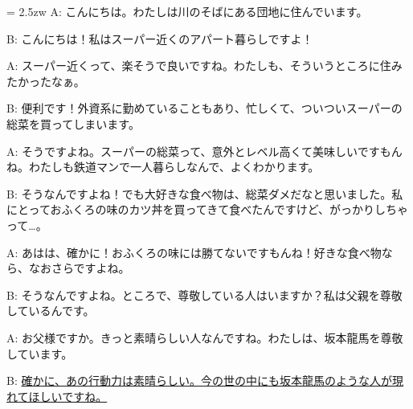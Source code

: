 \documentclass[11pt]{amsart}
\title{}
\author{}
\newenvironment{hangall}[1]{\hangindent = 2.5zw\everypar{\hangindent = 2.5zw}}{}
\begin{document}
\maketitle
\begin{hangall}{}%
A: こんにちは。わたしは川のそばにある団地に住んでいます。

B: こんにちは！私はスーパー近くのアパート暮らしですよ！

A: スーパー近くって、楽そうで良いですね。わたしも、そういうところに住みたかったなぁ。

B: 便利です！外資系に勤めていることもあり、忙しくて、ついついスーパーの総菜を買ってしまいます。

A: そうですよね。スーパーの総菜って、意外とレベル高くて美味しいですもんね。わたしも鉄道マンで一人暮らしなんで、よくわかります。

B: そうなんですよね！でも大好きな食べ物は、総菜ダメだなと思いました。私にとっておふくろの味のカツ丼を買ってきて食べたんですけど、がっかりしちゃって…。

A: あはは、確かに！おふくろの味には勝てないですもんね！好きな食べ物なら、なおさらですよね。

B: そうなんですよね。ところで、尊敬している人はいますか？私は父親を尊敬しているんです。

A: お父様ですか。きっと素晴らしい人なんですね。わたしは、坂本龍馬を尊敬しています。

B: \ul{確かに、あの行動力は素晴らしい。今の世の中にも坂本龍馬のような人が現れてほしいですね。}\end{hangall}
\end{document}
